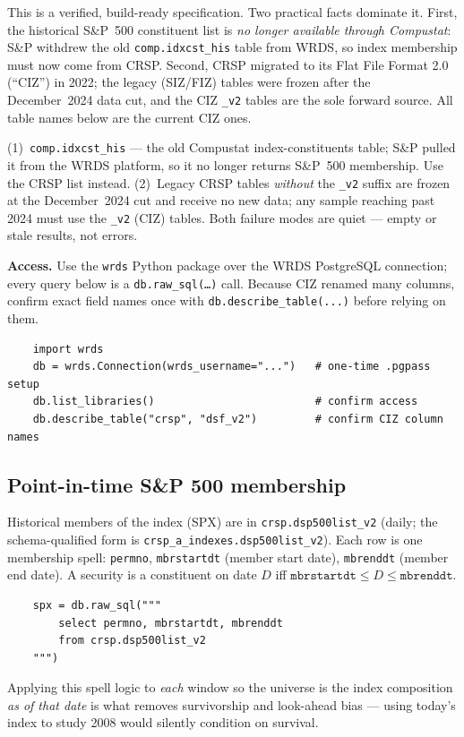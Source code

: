 \documentclass[11pt]{article}
\begin{document}
This is a verified, build-ready specification. Two practical facts dominate it. First, the
historical S\&P~500 constituent list is \emph{no longer available through Compustat}: S\&P
withdrew the old \texttt{comp.idxcst\_his} table from WRDS, so index membership must now come
from CRSP. Second, CRSP migrated to its Flat File Format 2.0 (``CIZ'') in 2022; the legacy
(SIZ/FIZ) tables were frozen after the December~2024 data cut, and the CIZ \texttt{\_v2} tables
are the sole forward source. All table names below are the current CIZ ones.

\begin{cautionbox}
(1)~\texttt{comp.idxcst\_his} --- the old Compustat index-constituents table; S\&P pulled it
from the WRDS platform, so it no longer returns S\&P~500 membership. Use the CRSP list instead.
(2)~Legacy CRSP tables \emph{without} the \texttt{\_v2} suffix are frozen at the December~2024
cut and receive no new data; any sample reaching past 2024 must use the \texttt{\_v2} (CIZ)
tables. Both failure modes are quiet --- empty or stale results, not errors.
\end{cautionbox}

\textbf{Access.} Use the \texttt{wrds} Python package over the WRDS PostgreSQL connection; every
query below is a \texttt{db.raw\_sql(\dots)} call. Because CIZ renamed many columns, confirm
exact field names once with \texttt{db.describe\_table(...)} before relying on them.
\begin{verbatim}
    import wrds
    db = wrds.Connection(wrds_username="...")   # one-time .pgpass setup
    db.list_libraries()                         # confirm access
    db.describe_table("crsp", "dsf_v2")         # confirm CIZ column names
\end{verbatim}

\subsection{Point-in-time S\&P 500 membership}
Historical members of the index (SPX) are in \texttt{crsp.dsp500list\_v2} (daily; the
schema-qualified form is \texttt{crsp\_a\_indexes.dsp500list\_v2}). Each row is one membership
spell: \texttt{permno}, \texttt{mbrstartdt} (member start date), \texttt{mbrenddt} (member end
date). A security is a constituent on date $D$ iff
$\texttt{mbrstartdt}\le D\le\texttt{mbrenddt}$.
\begin{verbatim}
    spx = db.raw_sql("""
        select permno, mbrstartdt, mbrenddt
        from crsp.dsp500list_v2
    """)
\end{verbatim}
Applying this spell logic to \emph{each} window so the universe is the index composition
\emph{as of that date} is what removes survivorship and look-ahead bias --- using today's index
to study 2008 would silently condition on survival.
\end{document}
